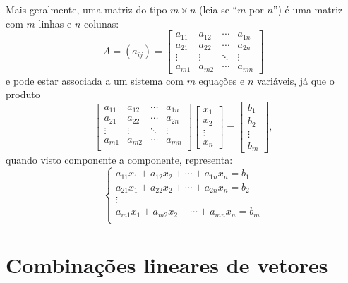 \documentclass[../livro.tex]{subfiles}  %
\begin{document}
Mais geralmente, uma matriz do tipo $m\times n$ (leia-se ``$m$ por $n$'') é uma matriz com $m$ linhas e $n$ colunas:
\begin{equation}
A = \left(a_{ij}\right) =
\begin{bmatrix}
a_{11}&a_{12}&\cdots &a_{1n}\\
a_{21}&a_{22}&\cdots &a_{2n}\\
\vdots &\vdots &\ddots &\vdots \\
a_{m1}&a_{m2}&\cdots &a_{mn}
\end{bmatrix}
\end{equation} e pode estar associada a um sistema com $m$ equações e $n$ variáveis, já que o produto
\begin{equation}
\left[
  \begin{array}{cccc}
  a_{11}&a_{12}&\cdots &a_{1n}\\
  a_{21}&a_{22}&\cdots &a_{2n}\\
  \vdots &\vdots &\ddots &\vdots \\
  a_{m1}&a_{m2}&\cdots &a_{mn} \\
\end{array}
\right]
\left[
  \begin{array}{c}
    x_1 \\
    x_2 \\
    \vdots \\
    x_n
  \end{array}
\right] =
\left[
  \begin{array}{c}
    b_1 \\
    b_2 \\
    \vdots \\
    b_m
  \end{array}
\right],
\end{equation} quando visto componente a componente, representa:
\begin{equation}
\left\{
  \begin{array}{cc}
  a_{11} x_1 + a_{12} x_2 + \cdots + a_{1n} x_n =  b_1 \\
  a_{21} x_1 + a_{22} x_2 + \cdots + a_{2n} x_n =  b_2 \\
    \vdots \\
  a_{m1} x_1 + a_{m2} x_2 + \cdots + a_{mn} x_n =  b_m \\
\end{array}
\right.
\end{equation}





\section{Combinações lineares de vetores}
\end{document}
